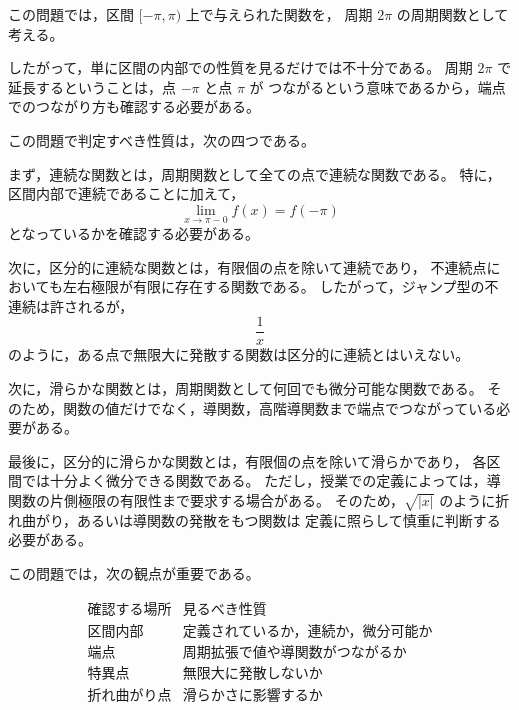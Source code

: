 \begin{background}
	この問題では，区間 \([-\pi,\pi)\) 上で与えられた関数を，
	周期 \(2\pi\) の周期関数として考える。
	
	したがって，単に区間の内部での性質を見るだけでは不十分である。
	周期 \(2\pi\) で延長するということは，点 \(-\pi\) と点 \(\pi\) が
	つながるという意味であるから，端点でのつながり方も確認する必要がある。
	
	この問題で判定すべき性質は，次の四つである。
	
	まず，連続な関数とは，周期関数として全ての点で連続な関数である。
	特に，区間内部で連続であることに加えて，
	\[
	\lim_{x\to \pi-0}f(x)=f(-\pi)
	\]
	となっているかを確認する必要がある。
	
	次に，区分的に連続な関数とは，有限個の点を除いて連続であり，
	不連続点においても左右極限が有限に存在する関数である。
	したがって，ジャンプ型の不連続は許されるが，
	\[
	\frac{1}{x}
	\]
	のように，ある点で無限大に発散する関数は区分的に連続とはいえない。
	
	次に，滑らかな関数とは，周期関数として何回でも微分可能な関数である。
	そのため，関数の値だけでなく，導関数，高階導関数まで端点でつながっている必要がある。
	
	最後に，区分的に滑らかな関数とは，有限個の点を除いて滑らかであり，
	各区間では十分よく微分できる関数である。
	ただし，授業での定義によっては，導関数の片側極限の有限性まで要求する場合がある。
	そのため，\(\sqrt{|x|}\) のように折れ曲がり，あるいは導関数の発散をもつ関数は
	定義に照らして慎重に判断する必要がある。
	
	この問題では，次の観点が重要である。
	
	\[
	\begin{array}{c|c}
		\text{確認する場所} & \text{見るべき性質} \\ \hline
		\text{区間内部} & \text{定義されているか，連続か，微分可能か} \\
		\text{端点} & \text{周期拡張で値や導関数がつながるか} \\
		\text{特異点} & \text{無限大に発散しないか} \\
		\text{折れ曲がり点} & \text{滑らかさに影響するか}
	\end{array}
	\]
\end{background}
